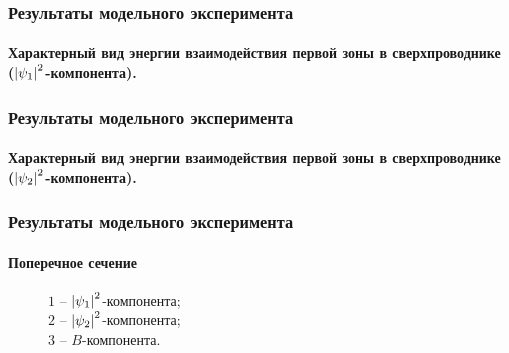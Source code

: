 \begin{frame}
    \frametitle{Результаты модельного эксперимента}
    \framesubtitle{Характерный вид энергии взаимодействия первой зоны в 
        сверхпроводнике (\( \left| \psi_1 \right|^2 \)-компонента).}
    \begin{figure}[h]
        \begin{minipage}[h]{0.49\linewidth}
            \center{\texttt{[image: 3d\_F1]}}
        \end{minipage}
        \hfill
        \begin{minipage}[h]{0.49\linewidth}
        \end{minipage}
    \end{figure}
\end{frame}

\begin{frame}
    \frametitle{Результаты модельного эксперимента}
    \framesubtitle{Характерный вид энергии взаимодействия первой зоны в 
        сверхпроводнике (\( \left| \psi_2 \right|^2 \)-компонента).}
    \begin{figure}[h]
        \begin{minipage}[h]{0.49\linewidth}
            \center{\texttt{[image: 3d\_F2]}}
        \end{minipage}
        \hfill
        \begin{minipage}[h]{0.49\linewidth}
        \end{minipage}
    \end{figure}
\end{frame}

\begin{frame}
    \frametitle{Результаты модельного эксперимента}
    \framesubtitle{Поперечное сечение}
    \begin{figure}[h]
        \begin{minipage}[h]{0.49\linewidth}
        \end{minipage}
        \hfill
        \begin{minipage}[h]{0.49\linewidth}
            \( 1 \) -- \( \left| \psi_1 \right|^2 \)-компонента; \\ 
            \( 2 \) -- \( \left| \psi_2 \right|^2 \)-компонента;\\
            \( 3 \) -- \( B \)-компонента.
        \end{minipage}
    \end{figure}
\end{frame}